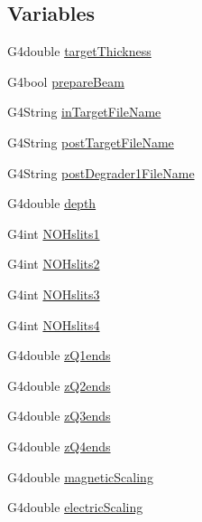 \subsection*{Variables}
\begin{DoxyCompactItemize}
\item 
G4double \hyperlink{EMMASteppingAction_8hh_a168924eff042d94e1e59a05bbcdcca38}{target\+Thickness}
\item 
G4bool \hyperlink{EMMASteppingAction_8hh_accd97970a0ee52817a02f8bdf0969668}{prepare\+Beam}
\item 
G4\+String \hyperlink{EMMASteppingAction_8hh_ab5043f10e6a2b6521cf9bdc5f9b50a14}{in\+Target\+File\+Name}
\item 
G4\+String \hyperlink{EMMASteppingAction_8hh_a44c8e472e5202caa69e70c5e8d18adf7}{post\+Target\+File\+Name}
\item 
G4\+String \hyperlink{EMMASteppingAction_8hh_ae92d83921bde0242f8c619b79b457b23}{post\+Degrader1\+File\+Name}
\item 
G4double \hyperlink{EMMASteppingAction_8hh_a08a40c9f48981a0140f43cbf773f3eea}{depth}
\item 
G4int \hyperlink{EMMASteppingAction_8hh_a9692863287fc6c571e3d80523f52aaec}{N\+O\+Hslits1}
\item 
G4int \hyperlink{EMMASteppingAction_8hh_a5a1b8ea664140faf390f322e99ff9eae}{N\+O\+Hslits2}
\item 
G4int \hyperlink{EMMASteppingAction_8hh_acd5e5641cf42ac1ee6029f01552f1242}{N\+O\+Hslits3}
\item 
G4int \hyperlink{EMMASteppingAction_8hh_a2999d2feb52b63936e73e99587a94643}{N\+O\+Hslits4}
\item 
G4double \hyperlink{EMMASteppingAction_8hh_a8825e4bac9c627d0fc56ceb808baee99}{z\+Q1ends}
\item 
G4double \hyperlink{EMMASteppingAction_8hh_a0389aed4a205ff7970a9c57db9776625}{z\+Q2ends}
\item 
G4double \hyperlink{EMMASteppingAction_8hh_aa309293d04a3e9edd55505001bb8842f}{z\+Q3ends}
\item 
G4double \hyperlink{EMMASteppingAction_8hh_aaefdf69418ceee3aabc72a346eef1799}{z\+Q4ends}
\item 
G4double \hyperlink{EMMASteppingAction_8hh_aeb29decdede3d925164d390a2bf4a67a}{magnetic\+Scaling}
\item 
G4double \hyperlink{EMMASteppingAction_8hh_a528ee0b2618db44ed7b0734789834f3d}{electric\+Scaling}
\end{DoxyCompactItemize}


